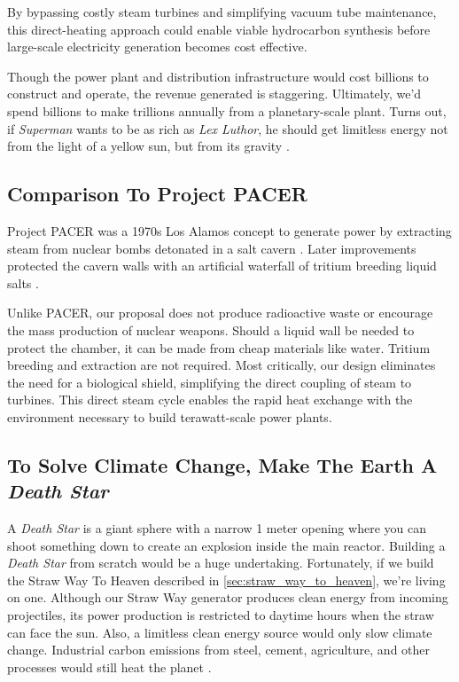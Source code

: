 \documentclass{article}
\begin{document}
By bypassing costly steam turbines and simplifying vacuum tube maintenance, this direct-heating approach could enable viable hydrocarbon synthesis before large-scale electricity generation becomes cost effective.

Though the power plant and distribution infrastructure would cost billions to construct and operate, the revenue generated is staggering. Ultimately, we'd spend billions to make trillions annually from a planetary-scale plant.  Turns out, if  \textit{Superman} wants to be as rich as \textit{Lex Luthor}, he should get limitless energy not from the light of a yellow sun, but from its gravity \cite{superman2025}.

\subsection{Comparison To Project PACER}
Project PACER was a 1970s Los Alamos concept to generate power by extracting steam from nuclear bombs detonated in a salt cavern \cite{pacer_1975}.   Later improvements protected the cavern walls with an artificial waterfall of tritium breeding liquid salts \cite{pacer_revisited}.  

Unlike PACER, our proposal does not produce radioactive waste or encourage the mass production of nuclear weapons.   Should a liquid wall be needed to protect the chamber, it can be made from cheap materials like water.  Tritium breeding and extraction are not required.   Most critically, our design eliminates the need for a biological shield, simplifying the direct coupling of steam to turbines. This direct steam cycle enables the rapid heat exchange with the environment necessary to build terawatt-scale power plants.

\subsection{To Solve Climate Change, Make The Earth A \textit{Death Star}}\label{sec:death_star}
A \textit{Death Star} \cite{death_star} is a giant sphere with a  narrow 1 meter opening where you can shoot something down to create an explosion inside the main reactor.   Building a \textit{Death Star} from scratch  would be a huge undertaking.   Fortunately, if we build the Straw Way To Heaven described in \autoref{sec:straw_way_to_heaven}, we're living on one.  Although our Straw Way generator produces clean energy from incoming projectiles, its power production is restricted to daytime hours when the straw can face the sun.   Also, a limitless clean energy source would only slow climate change.   Industrial carbon emissions from steel, cement, agriculture, and other processes would still heat the planet \cite{steel_and_cement}.   
\end{document}
